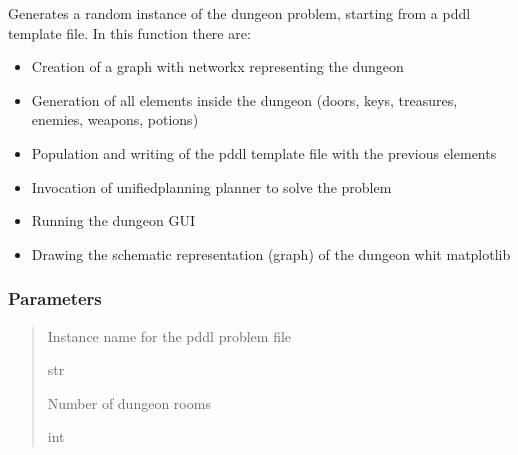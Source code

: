 \documentclass[letterpaper,10pt,english]{sphinxmanual}
\begin{document}

\begin{fulllineitems}
\label{\detokenize{api_reference/dungeon_resolver/generate_dungeon_problem:generate_dungeon_problem.generate_instance}}
\pysigstartsignatures
{}
\pysigstopsignatures
\sphinxAtStartPar
Generates a random instance of the dungeon problem, starting from a pddl template file.
In this function there are:
\begin{itemize}
\item {} 
\sphinxAtStartPar
Creation of a graph with networkx representing the dungeon

\item {} 
\sphinxAtStartPar
Generation of all elements inside the dungeon (doors, keys, treasures, enemies, weapons, potions)

\item {} 
\sphinxAtStartPar
Population and writing of the pddl template file with the previous elements

\item {} 
\sphinxAtStartPar
Invocation of unified\sphinxhyphen{}planning planner to solve the problem

\item {} 
\sphinxAtStartPar
Running the dungeon GUI

\item {} 
\sphinxAtStartPar
Drawing the schematic representation (graph) of the dungeon whit matplotlib

\end{itemize}


\subsubsection{Parameters}
\label{\detokenize{api_reference/dungeon_resolver/generate_dungeon_problem:id4}}\begin{quote}\begin{description}
\sphinxAtStartPar
Instance name for the pddl problem file

\sphinxAtStartPar
str

\sphinxAtStartPar
Number of dungeon rooms

\sphinxAtStartPar
int

\end{description}\end{quote}

\end{fulllineitems}
\end{document}

